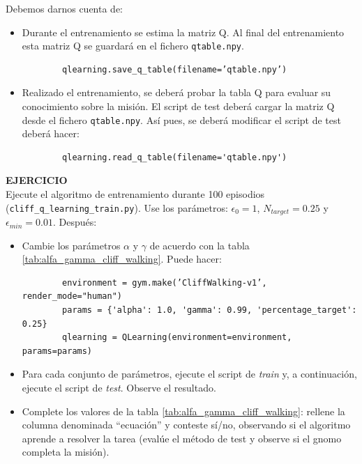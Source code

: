 \documentclass{article}
\begin{document}
Debemos darnos cuenta de:
\begin{itemize}
    \item Durante el entrenamiento se estima la matriz Q. Al final del entrenamiento esta matriz Q se guardará en el fichero \texttt{qtable.npy}. 
    \begin{verbatim}
        qlearning.save_q_table(filename=’qtable.npy’)
    \end{verbatim}
     \item Realizado el entrenamiento, se deberá probar la tabla Q para evaluar su conocimiento sobre la misión. El script de test deberá cargar la matriz Q desde el fichero \texttt{qtable.npy}. Así pues, se deberá modificar el script de test deberá hacer:
     \begin{verbatim}
        qlearning.read_q_table(filename='qtable.npy')
     \end{verbatim}
\end{itemize}


\begin{exercise}
\label{ej:alfa_gamma_cliff_walking}
\textbf{EJERCICIO}\\
Ejecute el algoritmo de entrenamiento durante 100 episodios (\texttt{cliff\_q\_learning\_train.py}). Use los parámetros: $\epsilon_0=1$, $N_{target}=0.25$ y $\epsilon_{min}=0.01$. Después:
\begin{itemize}
    \item[a)] Cambie los parámetros $\alpha$ y $\gamma$ de acuerdo con la tabla     \ref{tab:alfa_gamma_cliff_walking}. Puede hacer:
    \begin{verbatim}
        environment = gym.make(’CliffWalking-v1’, render_mode="human")
        params = {'alpha': 1.0, 'gamma': 0.99, 'percentage_target': 0.25}
        qlearning = QLearning(environment=environment, params=params)
    \end{verbatim}
    \item[b)] Para cada conjunto de parámetros, ejecute el script de \textit{train} y, a continuación, ejecute el script de \textit{test}. Observe el resultado.
    \item[c)] Complete los valores de la tabla \ref{tab:alfa_gamma_cliff_walking}: rellene la columna denominada ``ecuación'' y conteste sí/no, observando si el algoritmo aprende a resolver la tarea (evalúe el método de test y observe si el gnomo completa la misión).
\end{itemize}
\end{exercise}
\end{document}
